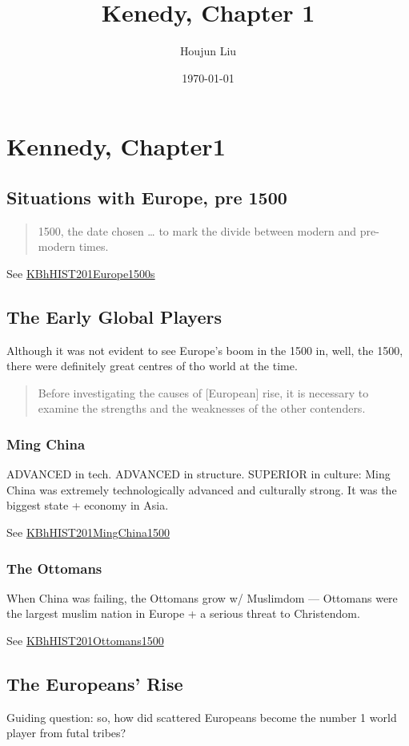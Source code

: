 \documentclass[letterpaper]{article}
\author{Houjun Liu}
\date{\today}
\title{Kenedy, Chapter 1}
\renewcommand{\tableofcontents}{}
\begin{document}
\tableofcontents



\section{Kennedy, Chapter1}
\label{sec:org0638420}
\subsection{Situations with Europe, pre 1500}
\label{sec:orgf3246c9}
\begin{quote}
1500, the date chosen \ldots{} to mark the divide between modern and
pre-modern times.
\end{quote}

See \href{KBhHIST201Europe1500s.org}{KBhHIST201Europe1500s}

\subsection{The Early Global Players}
\label{sec:orgb7af3e4}
Although it was not evident to see Europe's boom in the 1500 in, well,
the 1500, there were definitely great centres of tho world at the time.

\begin{quote}
Before investigating the causes of [European] rise, it is necessary to
examine the strengths and the weaknesses of the other contenders.
\end{quote}

\subsubsection{Ming China}
\label{sec:org89ccff7}
ADVANCED in tech. ADVANCED in structure. SUPERIOR in culture: Ming China
was extremely technologically advanced and culturally strong. It was the
biggest state + economy in Asia.

See \href{KBhHIST201MingChina1500.org}{KBhHIST201MingChina1500}

\subsubsection{The Ottomans}
\label{sec:orgdf90d17}
When China was failing, the Ottomans grow w/ Muslimdom --- Ottomans were
the largest muslim nation in Europe + a serious threat to Christendom.

See \href{KBhHIST201Ottomans1500.org}{KBhHIST201Ottomans1500}

\subsection{The Europeans' Rise}
\label{sec:org43bf18b}
Guiding question: so, how did scattered Europeans become the number 1
world player from futal tribes?
\end{document}
